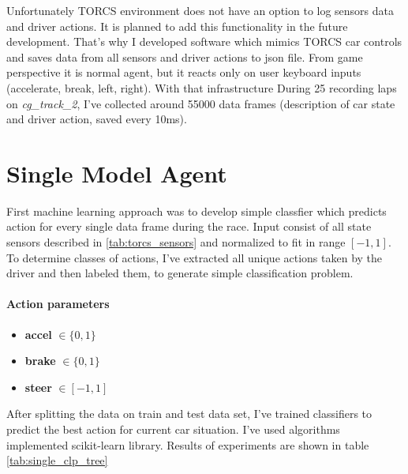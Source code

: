 \documentclass[declaration,shortabstract,english,inz]{iithesis}
\begin{document}
Unfortunately TORCS environment does not have an option to log sensors data and driver actions.
It is planned to add this functionality in the future development.
That's why I developed software which mimics TORCS car controls and saves data from all sensors and driver actions to json file.
From game perspective it is normal agent, but it reacts only on user keyboard inputs (accelerate, break, left, right).
 With that infrastructure During 25 recording laps on \textit{cg\_track\_2}, I've collected around 55000 data frames (description of car state and driver action, saved every 10ms).

\section{Single Model Agent}



First machine learning approach was to develop simple classfier which predicts action for every single data frame during the race.
Input consist of all state sensors described  in \ref{tab:torcs_sensors} and normalized to fit in range $[-1,1]$.
To determine classes of actions, I've extracted all unique actions taken by the driver and then labeled them, to generate simple classification problem.
\paragraph{Action parameters}
\begin{itemize}
    \item \textbf{accel} $\in \{0,1\}$
    \item \textbf{brake} $\in \{0,1\}$ 
    \item \textbf{steer} $\in [-1,1]$
\end{itemize}
After splitting the data on train and test data set, I've trained classifiers to predict the best action for current car situation.
I've used algorithms implemented scikit-learn \cite{scikit_learn} library.
Results of experiments are shown in table \ref{tab:single_clp_tree}
\end{document}
